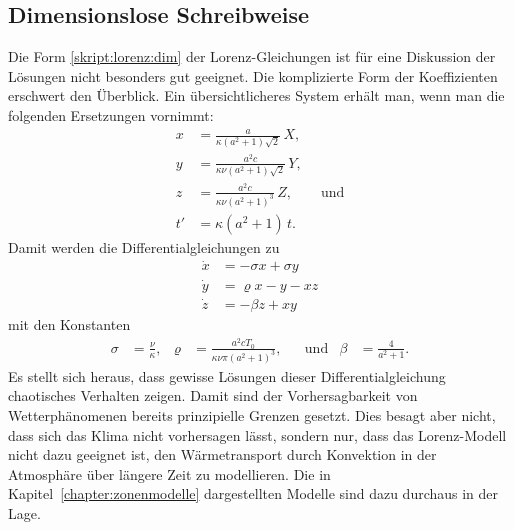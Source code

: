 \subsection{Dimensionslose Schreibweise}
Die Form \eqref{skript:lorenz:dim} der Lorenz-Gleichungen ist für eine
Diskussion der Lösungen nicht besonders gut geeignet.
Die komplizierte Form der Koeffizienten erschwert den Überblick.
Ein übersichtlicheres System erhält man, wenn man die folgenden
Ersetzungen vornimmt:
\begin{align*}
x
&=
\frac{a}{\kappa(a^2+1)\sqrt{2}}
\,
X,
\\
y
&=
\frac{a^2 c}{\kappa \nu (a^2+1)\sqrt{2}}
\,
Y,
\\
z
&=
\frac{a^2c}{\kappa\nu(a^2+1)^3}
\,
Z,\qquad\text{und}
\\
t'
&=
\kappa (a^2+1)\, t.
\end{align*}
Damit werden die Differentialgleichungen zu
\begin{align*}
\dot x &= -\sigma x + \sigma y\\
\dot y &= \varrho x - y - x z\\
\dot z &= -\beta z + x y
\end{align*}
mit den Konstanten
\begin{align*}
\sigma
&=
\frac{\nu}{\kappa},
&
\varrho
&=
\frac{a^2cT_0}{\kappa\nu\pi(a^2+1)^3},
&&\text{und}&
\beta
&=
\frac{4}{a^2 +1}.
\end{align*}
Es stellt sich heraus, dass gewisse Lösungen dieser Differentialgleichung
chaotisches Verhalten zeigen.
Damit sind der Vorhersagbarkeit von Wetterphänomenen bereits prinzipielle
Grenzen gesetzt.
Dies besagt aber nicht, dass sich das Klima nicht vorhersagen lässt,
sondern nur, dass das Lorenz-Modell nicht dazu geeignet ist, den
Wärmetransport durch Konvektion in der Atmosphäre über längere Zeit
zu modellieren.
Die in Kapitel~\ref{chapter:zonenmodelle} dargestellten Modelle sind
dazu durchaus in der Lage.






